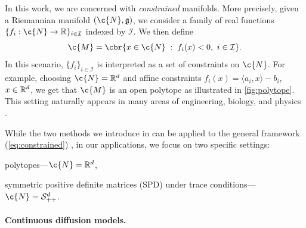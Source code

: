 In this work, we are concerned with \emph{constrained} manifolds.
More precisely, given a Riemannian manifold $(\c{N}, \mathfrak{g})$, we consider a family of real functions $\{f_i: \c{N} \to \R\}_{i \in \mathcal{I}}$ indexed by $\mathcal{I}$.
We then define \begin{equation} \label{eq:constrained} \c{M} = \cbr{x \in \c{N} \; : \; f_i(x) < 0 , \ i \in \mathcal{I}}.
\end{equation}
In this scenario, $\{f_i\}_{i \in \mathcal{I}}$ is interpreted as a set of constraints on \(\c{N}\).
For example, choosing $\c{N} = \R^d$ and affine constraints $f_i(x) = \langle a_i, x\rangle - b_i$, $x\in \mathbb{R}^d$, we get that $\c{M}$ is an open polytope as illustrated in \cref{fig:polytope}.
This setting naturally appears in many areas of engineering, biology, and physics \parencite{boyd2004convex, han2006inverse, lukens2020practical}.

While the two methods we introduce in  can be applied to the general framework (\ref{eq:constrained}) , in our applications, we focus on two specific settings: \begin{enumerate*}[label=(\alph*)] \item polytopes---$\c{N} = \R^d$, \item symmetric positive definite matrices (SPD) under trace conditions---$\c{N}=\mathcal{S}_{++}^{d}$.
\end{enumerate*}

\paragraph{Continuous diffusion models.}
\label{sec:sgm}

